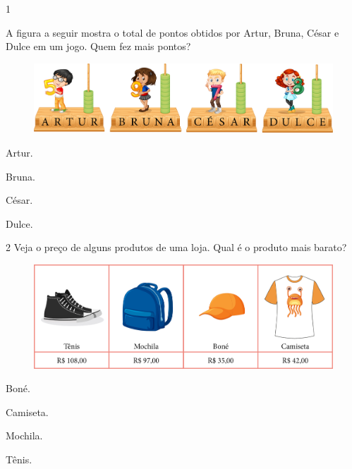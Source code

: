 
\num{1}

A figura a seguir mostra o total de pontos obtidos por Artur, Bruna, César
e Dulce em um jogo. Quem fez mais pontos?

\begin{figure}[htpb!]
\includegraphics[width=\textwidth]{./media/image124.png}
\end{figure}

\begin{escolha}
\item Artur.

\item Bruna.

\item César.

\item Dulce.
\end{escolha}

\num{2} Veja o preço de alguns produtos de uma loja. Qual é o produto mais
barato?

\begin{figure}[htpb!]
\includegraphics[width=\textwidth]{./media/image125.png}
\end{figure}

\begin{escolha}
\item Boné.

\item Camiseta.

\item Mochila.

\item Tênis.
\end{escolha}

